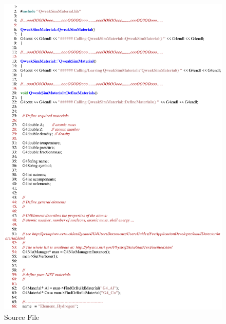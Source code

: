 \begin{figure}[h]
  \hspace{0cm}
  \includegraphics[scale=0.8]{./figures17/QweakSimMaterial.cc-p1.eps}
  \caption{\label{SourceXVII2} Source File}
           \label{fig:XVII-SC-2}
\end{figure}
\clearpage


